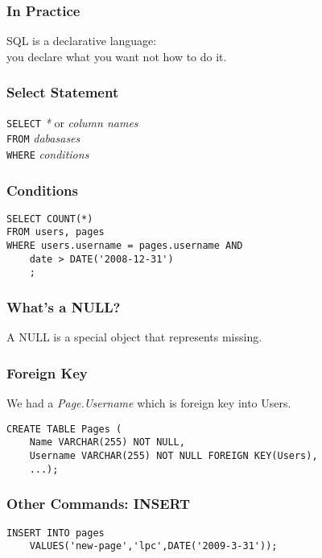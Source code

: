 \begin{frame}[fragile]
\frametitle{In Practice}

SQL is a \alert{declarative} language:\\
you declare what you want \alert{not how to do it}.

\end{frame}

\begin{frame}[fragile]
\frametitle{Select Statement}

\texttt{SELECT} \textit{*} or \textit{column names}\\
\texttt{FROM} \textit{dabasases}\\
\texttt{WHERE} \textit{conditions}

\end{frame}

\begin{frame}[fragile]
\frametitle{Conditions}

\begin{verbatim}
SELECT COUNT(*)
FROM users, pages
WHERE users.username = pages.username AND
    date > DATE('2008-12-31')
    ;
\end{verbatim}
\end{frame}

\begin{frame}[fragile]
\frametitle{What's a NULL?}

A NULL is a special object that represents \alert{missing}.

\end{frame}

\begin{frame}[fragile]
\frametitle{Foreign Key}
We had a \textit{Page.Username} which is foreign key into Users.

\begin{verbatim}
CREATE TABLE Pages (
    Name VARCHAR(255) NOT NULL,
    Username VARCHAR(255) NOT NULL FOREIGN KEY(Users),
    ...);
\end{verbatim}
\end{frame}

\begin{frame}[fragile]
\frametitle{Other Commands: INSERT}

\begin{verbatim}
INSERT INTO pages
    VALUES('new-page','lpc',DATE('2009-3-31'));
\end{verbatim}

\end{frame}

